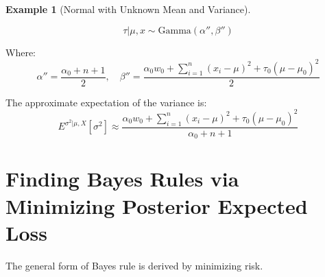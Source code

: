 \documentclass[
  letterpaper,
  DIV=11,
  numbers=noendperiod]{scrreprt}
\renewcommand{\[}{\begin{equation}}
\renewcommand{\]}{\end{equation}}
\theoremstyle{definition}
\theoremstyle{plain}
\theoremstyle{plain}
\theoremstyle{plain}
\theoremstyle{definition}
\newtheorem{example}{Example}[chapter]
\theoremstyle{plain}
\theoremstyle{remark}
\begin{document}
\begin{example}[Normal with Unknown Mean and
Variance]
\begin{itemize}
  \[ \tau|\mu, x \sim \text{Gamma}(\alpha'', \beta'') \]

  Where:
  \[ \alpha'' = \frac{\alpha_0 + n + 1}{2}, \quad \beta'' = \frac{\alpha_0 w_0 + \sum_{i=1}^n (x_i-\mu)^2 + \tau_0(\mu-\mu_0)^2}{2} \]

  The approximate expectation of the variance is: \[
    E^{\sigma^2|\mu, X}[\sigma^2] \approx \frac{\alpha_0 w_0 + \sum_{i=1}^n (x_i-\mu)^2 + \tau_0(\mu-\mu_0)^2}{\alpha_0 + n + 1}
    \]
\end{itemize}

\end{example}

\section{Finding Bayes Rules via Minimizing Posterior Expected
Loss}\label{finding-bayes-rules-via-minimizing-posterior-expected-loss}

The general form of Bayes rule is derived by minimizing risk.
\end{document}
